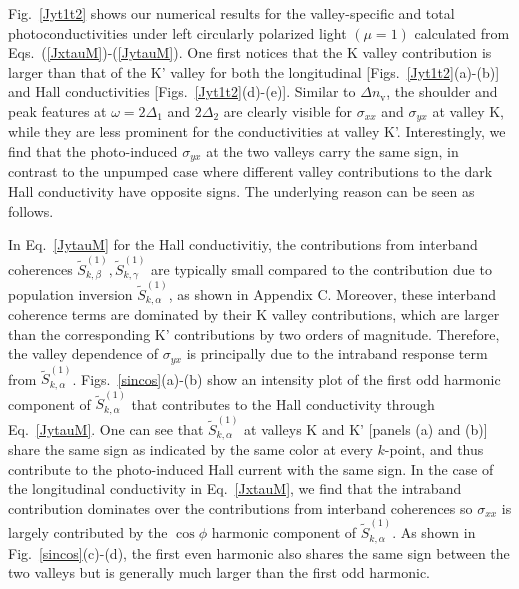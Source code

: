 \documentclass[reprint,amsmath,amssymb,aps,prb]{revtex4-1}
\begin{document}
Fig.~\ref{Jyt1t2} shows our numerical results for  the valley-specific and total photoconductivities under left circularly polarized light $(\mu=1)$ calculated from Eqs.~(\ref{JxtauM})-(\ref{JytauM}). One first notices that the K valley contribution is larger than that of the K' valley for both the longitudinal [Figs.~\ref{Jyt1t2}(a)-(b)] and Hall conductivities [Figs.~\ref{Jyt1t2}(d)-(e)]. Similar to $\Delta n_{\mathrm{v}}$, the shoulder and peak features at $\omega = 2\Delta_1$ and $2\Delta_2$ are clearly visible for $\sigma_{xx}$ and $\sigma_{yx}$ at valley K, while they are less prominent for the conductivities at valley K'. Interestingly, we find that the photo-induced  $\sigma_{yx}$ at the two valleys carry the same sign, in contrast to the unpumped case where different valley contributions to the dark Hall conductivity have opposite signs. The underlying reason can be seen as follows. 

In Eq.~\eqref{JytauM} for  the Hall conductivitiy, the contributions from interband coherences $\tilde{S}_{k,\beta}^{(1)}, \tilde{S}_{k,\gamma}^{(1)}$ are typically small compared to the contribution due to  population inversion  $\tilde{S}_{k,\alpha}^{(1)}$, as shown in Appendix C. Moreover, these interband coherence terms are dominated by their K valley contributions, which are larger than the  corresponding K' contributions by two orders of magnitude. Therefore, the valley dependence of $\sigma_{yx}$ is principally due to the intraband response term from $\tilde{S}_{k,\alpha}^{(1)}$. 
Figs.~\ref{sincos}(a)-(b) show an intensity plot of the first odd harmonic component of $\tilde{S}_{k,\alpha}^{(1)}$ that contributes to the Hall conductivity through Eq.~\ref{JytauM}. One can see that $\tilde{S}_{k,\alpha}^{(1)}$ at valleys K and K' [panels (a) and (b)] share the same sign as indicated by the same color at every $k$-point, and thus contribute  to the photo-induced Hall current with the same sign. 
In the case of the  longitudinal conductivity in Eq.~\eqref{JxtauM}, we find that  the intraband contribution dominates over the contributions from interband coherences
so $\sigma_{xx}$   is largely contributed by the $\cos\phi$ harmonic component of $\tilde{S}_{k,\alpha}^{(1)}$. 
As shown in  Fig.~\ref{sincos}(c)-(d), the first even harmonic also  shares the same sign between the two valleys but is  generally much larger than the first odd harmonic.
\end{document}
